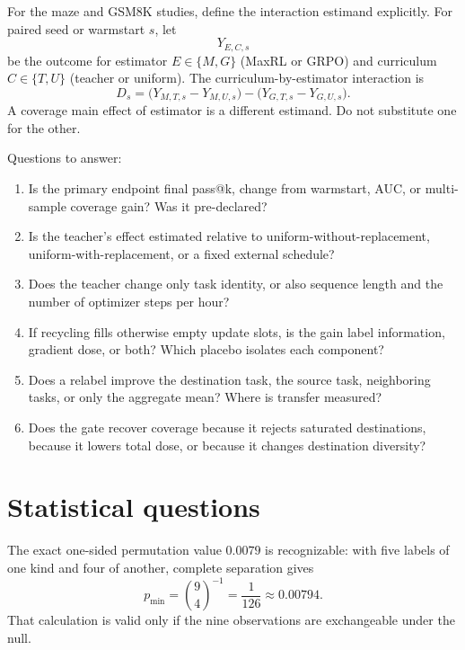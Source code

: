 \documentclass[11pt]{article}
\theoremstyle{definition}
\theoremstyle{remark}
\begin{document}
For the maze and GSM8K studies, define the interaction estimand explicitly. For paired seed or warmstart $s$, let
\[
Y_{E,C,s}
\]
be the outcome for estimator $E\in\{M,G\}$ (MaxRL or GRPO) and curriculum $C\in\{T,U\}$ (teacher or uniform). The curriculum-by-estimator interaction is
\begin{equation}
D_s=\bigl(Y_{M,T,s}-Y_{M,U,s}\bigr)
-\bigl(Y_{G,T,s}-Y_{G,U,s}\bigr).
\label{eq:interaction}
\end{equation}
A coverage main effect of estimator is a different estimand. Do not substitute one for the other.

Questions to answer:

\begin{enumerate}[leftmargin=2em]
\item Is the primary endpoint final pass@k, change from warmstart, AUC, or multi-sample coverage gain? Was it pre-declared?
\item Is the teacher's effect estimated relative to uniform-without-replacement, uniform-with-replacement, or a fixed external schedule?
\item Does the teacher change only task identity, or also sequence length and the number of optimizer steps per hour?
\item If recycling fills otherwise empty update slots, is the gain label information, gradient dose, or both? Which placebo isolates each component?
\item Does a relabel improve the destination task, the source task, neighboring tasks, or only the aggregate mean? Where is transfer measured?
\item Does the gate recover coverage because it rejects saturated destinations, because it lowers total dose, or because it changes destination diversity?
\end{enumerate}

\section{Statistical questions}

The exact one-sided permutation value $0.0079$ is recognizable: with five labels of one kind and four of another, complete separation gives
\begin{equation}
 p_{\min}=\binom{9}{4}^{-1}=\frac1{126}\approx0.00794.
\label{eq:minperm}
\end{equation}
That calculation is valid only if the nine observations are exchangeable under the null.
\end{document}
